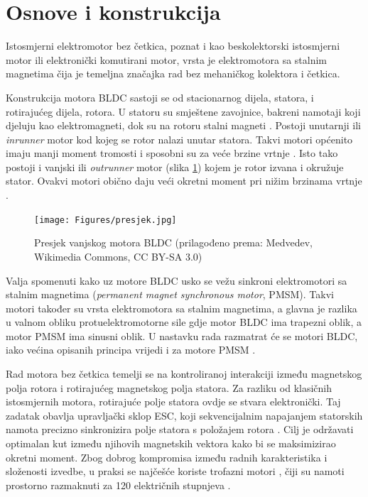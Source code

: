 \documentclass[diplomskirad]{fer}
\begin{document}
\section{Osnove i konstrukcija}
\label{sec:bldc:uvod}

Istosmjerni elektromotor bez četkica, poznat i kao beskolektorski istosmjerni
motor ili elektronički komutirani motor, vrsta je elektromotora sa stalnim
magnetima čija je temeljna značajka rad bez mehaničkog kolektora i četkica.

Konstrukcija motora BLDC sastoji se od stacionarnog dijela, statora, i
rotirajućeg dijela, rotora. U statoru su smještene zavojnice, bakreni namotaji
koji djeluju kao elektromagneti, dok su na rotoru stalni magneti
\cite{elektromotor-beskolektorski}. Postoji unutarnji ili \textit{inrunner}
motor kod kojeg se rotor nalazi unutar statora. Takvi motori općenito imaju
manji moment tromosti i sposobni su za veće brzine vrtnje \cite{cite:bldc}.
Isto tako postoji i vanjski ili \textit{outrunner} motor (slika
\ref{fig:presjek_motora}) kojem je rotor izvana i okružuje stator. Ovakvi
motori obično daju veći okretni moment pri nižim brzinama vrtnje
\cite{cite:bldc}.

\begin{figure}[h!]
	\centering
	\texttt{[image: Figures/presjek.jpg]}
	\caption{Presjek vanjskog motora BLDC (prilagođeno prema: Medvedev, Wikimedia Commons, CC BY-SA 3.0)}
	\label{fig:presjek_motora}
\end{figure}

Valja spomenuti kako uz motore BLDC usko se vežu sinkroni elektromotori sa
stalnim magnetima (\textit{permanent magnet synchronous motor}, PMSM). Takvi
motori također su vrsta elektromotora sa stalnim magnetima, a glavna je razlika
u valnom obliku protuelektromotorne sile gdje motor BLDC ima trapezni oblik, a
motor PMSM ima sinusni oblik. U nastavku rada razmatrat će se motori BLDC, iako
većina opisanih principa vrijedi i za motore PMSM
\cite{elektromotor-sa-stalnim-magnetima}.

Rad motora bez četkica temelji se na kontroliranoj interakciji između
magnetskog polja rotora i rotirajućeg magnetskog polja statora. Za razliku od
klasičnih istosmjernih motora, rotirajuće polje statora ovdje se stvara
elektronički. Taj zadatak obavlja upravljački sklop ESC, koji sekvencijalnim
napajanjem statorskih namota precizno sinkronizira polje statora s položajem
rotora \cite{cite:disertacija}. Cilj je održavati optimalan kut između njihovih
magnetskih vektora kako bi se maksimizirao okretni moment. Zbog dobrog
kompromisa između radnih karakteristika i složenosti izvedbe, u praksi se
najčešće koriste trofazni motori \cite{cite:trofazni}, čiji su namoti prostorno
razmaknuti za 120 električnih stupnjeva \cite{MicrochipAN885}.
\end{document}
